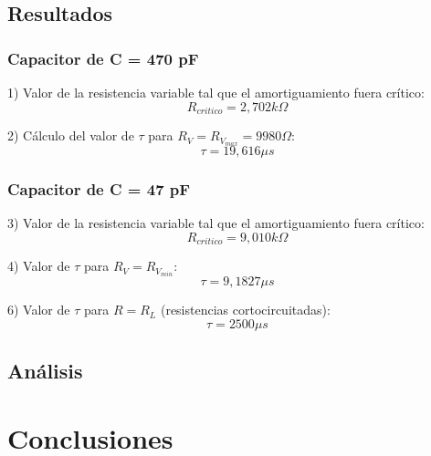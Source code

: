 \documentclass{article}
\begin{document}
        \subsection{Resultados}

            \subsubsection*{Capacitor de C = 470 pF}
                1) Valor de la resistencia variable tal que el amortiguamiento fuera crítico:
                \begin{equation}
                    R_{critico} = 2,702 k\Omega
                \end{equation} \par
                2) Cálculo del valor de $ \tau $ para $ R_V = R_{V_{max}} = 9980 \Omega $:
                 \begin{equation}
                    \tau = 19,616 \mu s 
                \end{equation}

            \subsubsection*{Capacitor de C = 47 pF}
                3) Valor de la resistencia variable tal que el amortiguamiento fuera crítico:
                \begin{equation}
                    R_{critico} = 9,010 k\Omega 
                \end{equation} \par
                4) Valor de $ \tau $ para $ R_V = R_{V_{min}} $:
                \begin{equation}
                    \tau = 9,1827 \mu s 
                \end{equation} \par
                6) Valor de $ \tau $ para $ R = R_L $ (resistencias cortocircuitadas):
                \begin{equation}
                    \tau = 2500 \mu s 
                \end{equation}
        


    \subsection{Análisis}
\section{Conclusiones}
\end{document}

